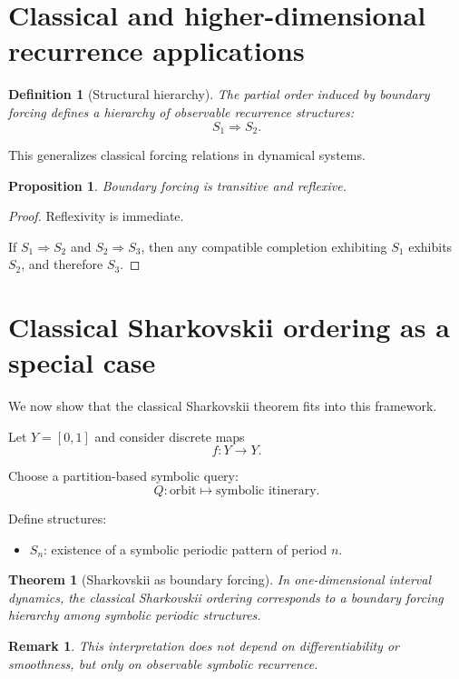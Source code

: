 \documentclass[11pt]{article}
\newtheorem{definition}{Definition}
\newtheorem{proposition}{Proposition}
\newtheorem{theorem}{Theorem}
\newtheorem{remark}{Remark}
\begin{document}
\section{Classical and higher-dimensional recurrence applications}

\begin{definition}[Structural hierarchy]
The partial order induced by boundary forcing defines a hierarchy of
observable recurrence structures:
\[
S_1 \Rightarrow S_2.
\]
\end{definition}

This generalizes classical forcing relations in dynamical systems.

\begin{proposition}
Boundary forcing is transitive and reflexive.
\end{proposition}

\begin{proof}
Reflexivity is immediate.

If $S_1 \Rightarrow S_2$ and $S_2 \Rightarrow S_3$, then any compatible
completion exhibiting $S_1$ exhibits $S_2$, and therefore $S_3$.
\end{proof}

\section{Classical Sharkovskii ordering as a special case}

We now show that the classical Sharkovskii theorem fits into this framework.

Let $Y=[0,1]$ and consider discrete maps
\[
f:Y\to Y.
\]

Choose a partition-based symbolic query:
\[
Q:\text{orbit} \mapsto \text{symbolic itinerary}.
\]

Define structures:
\begin{itemize}
\item $S_n$: existence of a symbolic periodic pattern of period $n$.
\end{itemize}

\begin{theorem}[Sharkovskii as boundary forcing]
In one-dimensional interval dynamics, the classical Sharkovskii ordering
corresponds to a boundary forcing hierarchy among symbolic periodic
structures.
\end{theorem}

\begin{remark}
This interpretation does not depend on differentiability or smoothness,
but only on observable symbolic recurrence.
\end{remark}
\end{document}
